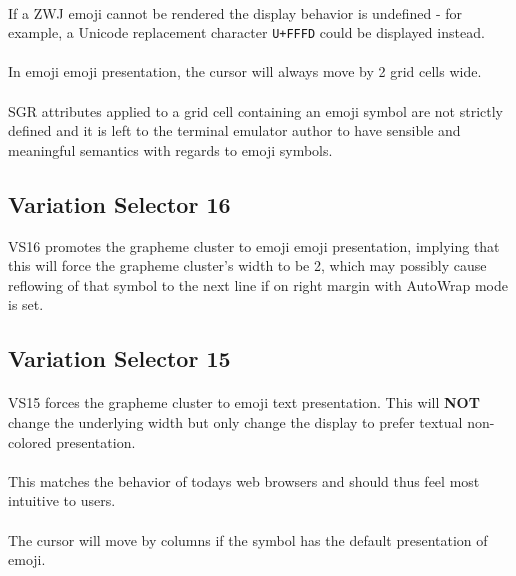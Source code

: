 \documentclass{article}
\newcommand{\code}[1]{\colorbox{light-gray}{\texttt{#1}}}
\begin{document}
\paragraph*{}
If a ZWJ emoji cannot be rendered the display behavior is undefined -
for example, a Unicode replacement character \code{U+FFFD} could be
displayed instead.

\paragraph*{}
In emoji emoji presentation, the cursor will always move by 2 grid cells wide.

\paragraph*{}
SGR attributes applied to a grid cell containing an emoji symbol are
not strictly defined and it is left to the terminal emulator author to have
sensible and meaningful semantics with regards to emoji symbols.

\subsection{Variation Selector 16}

VS16 promotes the grapheme cluster to emoji emoji presentation,
implying that this will force the grapheme cluster's width to be 2,
which may possibly cause reflowing of that symbol to the next line
if on right margin with AutoWrap mode is set.

\subsection{Variation Selector 15}

\paragraph*{}
VS15 forces the grapheme cluster to emoji text presentation.
This will \textbf{NOT} change the underlying width
but only change the display to prefer textual non-colored presentation.

\paragraph*{}
This matches the behavior of todays web browsers and should thus
feel most intuitive to users.

\paragraph*{}
The cursor will move by columns if the symbol has the default presentation of emoji.
\end{document}
